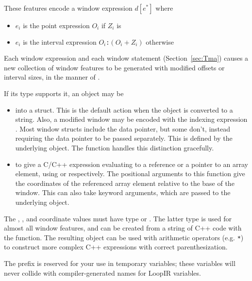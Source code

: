 These features encode a window expression $d[e^*]$ where
\begin{itemize}
  \item $e_i$ is the point expression $O_i$ if $Z_i$ is 
  \item $e_i$ is the interval expression $O_i$\texttt{:}$(O_i + Z_i)$ otherwise
\end{itemize}
Each window expression and each window statement (Section~\ref{sec:Tma}) causes a new collection of window features to be generated with modified offsets or interval sizes, in the manner of .

If its  type supports it, an  object may be
\begin{itemize}
  \item {} into a struct.
  This is the default action when the object is converted to a string.
  Also, a modified window may be encoded with the indexing expression .
  Most window structs include the data pointer, but some don't, instead requiring the data pointer to be passed separately.
  This is defined by the underlying  object.
  The  function handles this distinction gracefully.

  \item {} to give a C/C++ expression evaluating to a reference or a pointer to an array element, using  or  respectively.
  The positional arguments to this function give the coordinates of the referenced array element relative to the base of the window.
  This can also take keyword arguments, which are passed to the underlying  object.
\end{itemize}
The , , and  coordinate values must have type  or .
The latter type is used for almost all window features, and can be created from a string of C++ code with the  function.
The resulting object can be used with arithmetic operators (e.g. \texttt{*}) to construct more complex C++ expressions with correct parenthesization.

 The  prefix is reserved for your use in temporary variables;
these variables will never collide with compiler-generated names for LoopIR variables.

